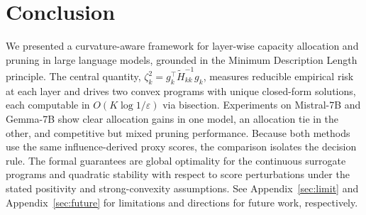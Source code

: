 \documentclass[accepted]{uai2026}%
\theoremstyle{remark}%
\begin{document}
\begin{table}[tbh]
\centering
\caption{Mean zero-shot accuracy (\%) across 7 benchmarks for pruning on Gemma-7B at 50\% sparsity (layer cap 0.55). Rows show the calibration dataset used to compute influence scores.}
\label{tab:pruning_gemma}
\end{table}




\section{Conclusion}
\label{sec:conclusion}

We presented a curvature-aware framework for layer-wise capacity
allocation and pruning in large language models, grounded in the
Minimum Description Length principle.
The central quantity, $\zeta_k^2 = g_k^\top\widetilde{H}_{kk}^{-1}g_k$,
measures reducible empirical risk at each layer and drives two convex
programs with unique closed-form solutions, each computable in
$O(K\log 1/\varepsilon)$ via bisection.
Experiments on Mistral-7B and Gemma-7B show clear allocation
gains in one model, an allocation tie in the other, and competitive but mixed
pruning performance. Because both methods use the same influence-derived
proxy scores, the comparison isolates the decision rule. The formal guarantees
are global optimality for the continuous surrogate programs and quadratic
stability with respect to score perturbations under the stated positivity and
strong-convexity assumptions.
See Appendix~\ref{sec:limit} and Appendix~\ref{sec:future} for limitations
and directions for future work, respectively.
\end{document}
